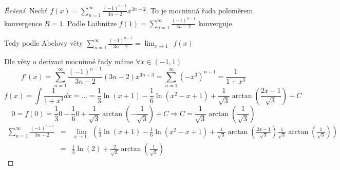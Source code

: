 \begin{proof}[Řešení]
Nechť $f(x) = \sum_{n=1}^{\infty} \frac{(-1)^{n-1}}{3n-2} x^{3n-2}$. To je mocninná řada poloměrem konvergence $R=1$. Podle Laibnitze $f(1) = \sum_{n=1}^{\infty} \frac{(-1)^{n-1}}{3n-2}$ konverguje. 

Tedy podle Abelovy věty $\sum_{n=1}^{\infty} \frac{(-1)^{n-1}}{3n-2} = \lim_{x \rightarrow 1_-} f(x)$

Dle věty o derivaci mocninné řady máme $\forall x \in (-1, 1)$
$$f'(x) = \sum_{n=1}^{\infty} \frac{(-1)^{n-1}}{3n-2} (3n-2) x^{3n-3} = \sum_{n=1}^{\infty} \left( -x^3 \right)^{n-1} = \frac{1}{1+x^3}$$
$$f(x) = \int \frac{1}{1+x^3} dx = \ldots = \frac{1}{3} \ln(x+1) - \frac{1}{6} \ln(x^2-x+1) + \frac{1}{\sqrt{3}} \arctan \left( \frac{2x-1}{\sqrt{3}} \right) + C$$
$$0 = f(0) = \frac{1}{3} 0 - \frac{1}{6} 0 + \frac{1}{\sqrt{3}} \arctan \left( - \frac{1}{\sqrt{3}} \right) + C \Rightarrow C = \frac{1}{\sqrt{3}} \arctan \left( \frac{1}{\sqrt{3}} \right)$$
\begin{eqnarray*}
\sum_{n=1}^{\infty} \frac{(-1)^{n-1}}{3n-2} & = & \lim_{x \rightarrow 1_-} \left( \frac{1}{3} \ln(x+1) - \frac{1}{6} \ln(x^2-x+1) + \frac{1}{\sqrt{3}} \arctan \left( \frac{2x-1}{\sqrt{3}} \right) \frac{1}{\sqrt{3}} \arctan \left( \frac{1}{\sqrt{3}} \right) \right) \\
& = & \frac{1}{3} \ln(2) + \frac{2}{\sqrt{3}} \arctan \left( \frac{1}{\sqrt{3}} \right) 
\end{eqnarray*}
\end{proof}

